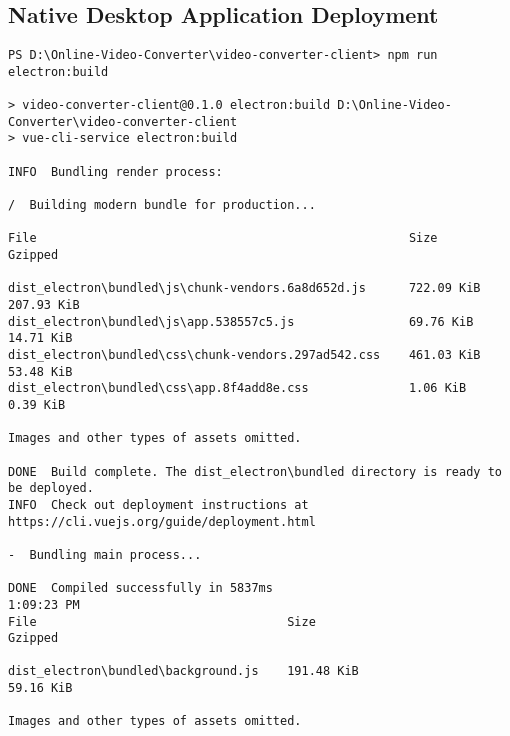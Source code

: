\subsection{Native Desktop Application Deployment}		
\begin{verbatim}
PS D:\Online-Video-Converter\video-converter-client> npm run electron:build

> video-converter-client@0.1.0 electron:build D:\Online-Video-Converter\video-converter-client
> vue-cli-service electron:build

INFO  Bundling render process:

/  Building modern bundle for production...

File                                                    Size                                                                           Gzipped

dist_electron\bundled\js\chunk-vendors.6a8d652d.js      722.09 KiB                                                                     207.93 KiB
dist_electron\bundled\js\app.538557c5.js                69.76 KiB                                                                      14.71 KiB
dist_electron\bundled\css\chunk-vendors.297ad542.css    461.03 KiB                                                                     53.48 KiB
dist_electron\bundled\css\app.8f4add8e.css              1.06 KiB                                                                       0.39 KiB

Images and other types of assets omitted.

DONE  Build complete. The dist_electron\bundled directory is ready to be deployed.
INFO  Check out deployment instructions at https://cli.vuejs.org/guide/deployment.html

-  Bundling main process...

DONE  Compiled successfully in 5837ms                                                                                                                                                                          1:09:23 PM
File                                   Size                                                                                   Gzipped  

dist_electron\bundled\background.js    191.48 KiB                                                                             59.16 KiB

Images and other types of assets omitted.


\end{verbatim}
